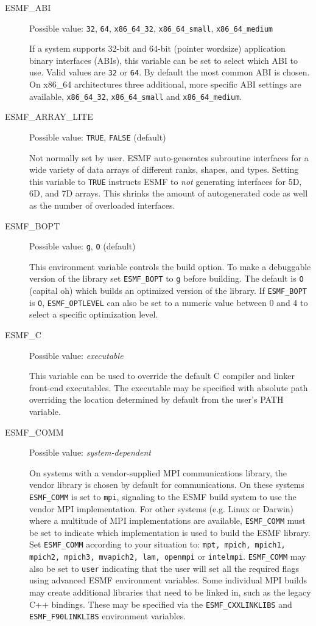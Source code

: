 \begin{description}

\item[ESMF\_ABI]
Possible value: {\tt 32}, {\tt 64}, {\tt x86\_64\_32}, {\tt x86\_64\_small}, {\tt x86\_64\_medium}

If a system supports 32-bit and 64-bit (pointer wordsize) application binary
interfaces (ABIs), this variable can be set to select which ABI to use. Valid
values are {\tt 32} or {\tt 64}. By default the most common ABI is chosen. On
x86\_64 architectures three additional, more specific ABI settings are available,
{\tt x86\_64\_32}, {\tt x86\_64\_small} and {\tt x86\_64\_medium}.

\item[ESMF\_ARRAY\_LITE]
Possible value: {\tt TRUE}, {\tt FALSE} (default)

Not normally set by user. ESMF auto-generates subroutine interfaces for a wide
variety of data arrays of different ranks, shapes, and types. Setting this
variable to {\tt TRUE} instructs ESMF to {\em not} generating interfaces for
5D, 6D, and 7D arrays. This shrinks the amount of autogenerated code as well
as the number of overloaded interfaces.

\item[ESMF\_BOPT]
Possible value: {\tt g}, {\tt O} (default)

This environment variable controls the build option. To make a debuggable
version of the library set {\tt ESMF\_BOPT} to {\tt g} before building. The
default is {\tt O} (capital oh) which builds an optimized version of the
library. If {\tt ESMF\_BOPT} is {\tt O}, {\tt ESMF\_OPTLEVEL} can also be set
to a numeric value between 0 and 4 to select a specific optimization level.

\item[ESMF\_C]
Possible value: {\em executable}

This variable can be used to override the default C compiler and linker
front-end executables. The executable may be specified with absolute path
overriding the location determined by default from the user's PATH variable.

\item[ESMF\_COMM]
Possible value: {\em system-dependent}

On systems with a vendor-supplied MPI communications library, the vendor library
is chosen by default for communications. On these systems {\tt ESMF\_COMM} is
set to {\tt mpi}, signaling to the ESMF build system to use the vendor MPI
implementation.
For other systems (e.g. Linux or Darwin) where a multitude of MPI
implementations are available, {\tt ESMF\_COMM} must be set to indicate which
implementation is used to build the ESMF library. Set {\tt ESMF\_COMM} according
to your situation to: {\tt mpt, mpich, mpich1, mpich2, mpich3, mvapich2, lam, openmpi}
or {\tt intelmpi}. {\tt ESMF\_COMM} may also be set to {\tt user} indicating
that the user will set all the required flags using advanced ESMF environment
variables.  Some individual MPI builds may create additional libraries that
need to be linked in, such as the legacy C++ bindings. These may be specified
via the {\tt ESMF\_CXXLINKLIBS} and {\tt ESMF\_F90LINKLIBS} environment
variables.


\end{description}
